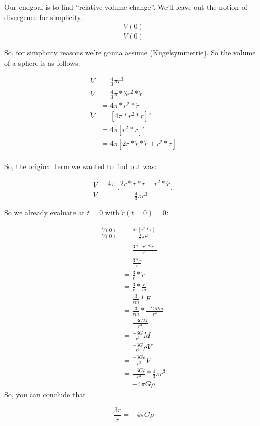 \documentclass{article}
\begin{document}
Our endgoal is to find ``relative volume change''. We'll leave out the notion of divergence for simplicity.
$$\frac{\ddot{V}(0)}{V(0)}$$

So, for simplicity reasons we're gonna assume (Kugelsymmetrie). So the volume of a sphere is as follows:

\begin{equation}
\begin{aligned}
V &= \frac{4}{3} \pi r^3 \\
\dot{V} &= \frac{4}{3}\pi * 3r^2 *\dot{r}\\
&= 4\pi * r^2 *\dot{r}\\
\ddot{V} &= [4\pi * r^2 * \dot{r}]'\\
&= 4\pi [r^2 * \dot{r}]'\\
&= 4\pi [2r*\dot{r}*\dot{r} + r^2 * \ddot{r}]\\
\end{aligned}
\end{equation}

So, the original term we wanted to find out was:

$$\frac{\ddot{V}}{V}=\frac{4\pi [2r*\dot{r}*\dot{r} + r^2 *\ddot{r}]}{\frac{4}{3}\pi r^3}$$

So we already evaluate at $t=0$ with $\dot{r}(t=0)=0$:

\begin{equation}
\begin{aligned}
\frac{\ddot{V}(0)}{V(0)}&=\frac{4\pi [r^2 * \ddot{r}]}{\frac{4}{3}\pi r^3}\\
&=\frac{3* [r^2 * \ddot{r}]}{r^3}\\
&=\frac{3* \ddot{r}}{r}\\
&=\frac{3}{r}*\ddot{r}\\
&=\frac{3}{r}*\frac{F}{m}\\
&=\frac{3}{rm}*F\\
&=\frac{3}{rm}*\frac{-GMm}{r^2}\\
&=\frac{-3GM}{r^3}\\
&=\frac{-3G}{r^3}M\\
&=\frac{-3G}{r^3}\rho V\\
&=\frac{-3G\rho}{r^3} V\\
&=\frac{-3G\rho}{r^3} * \frac{4}{3}\pi r^3\\
&=-4\pi G \rho
\end{aligned}
\end{equation}
So, you can conclude that 

$$\frac{3\ddot{r}}{r} = -4\pi G \rho$$
\end{document}
